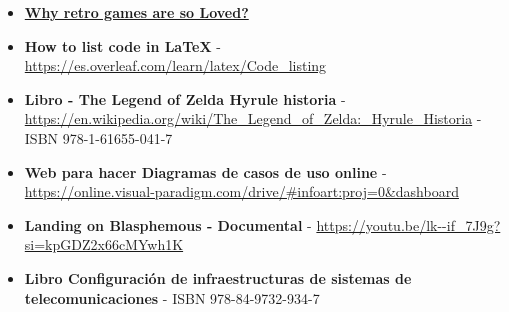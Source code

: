 \documentclass[a4paper]{article}
\begin{document}
\begin{itemize}
    \item \textbf{\href{https://www.wired.com/story/why-retro-looking-games-get-so-much-love/}{Why retro games are so Loved?}}
    \item \textbf{How to list code in LaTeX} - \url{https://es.overleaf.com/learn/latex/Code_listing}
    \item \textbf{Libro - The Legend of Zelda Hyrule historia} - \url{https://en.wikipedia.org/wiki/The_Legend_of_Zelda:_Hyrule_Historia} - ISBN 978-1-61655-041-7
    \item \textbf{Web para hacer Diagramas de casos de uso online} - \url{https://online.visual-paradigm.com/drive/#infoart:proj=0&dashboard}
    \item \textbf{Landing on Blasphemous - Documental} - \url{https://youtu.be/lk--if_7J9g?si=kpGDZ2x66cMYwh1K}
    \item \textbf{Libro Configuración de infraestructuras de sistemas de telecomunicaciones} - ISBN 978-84-9732-934-7
\end{itemize}

\clearpage
\end{document}
